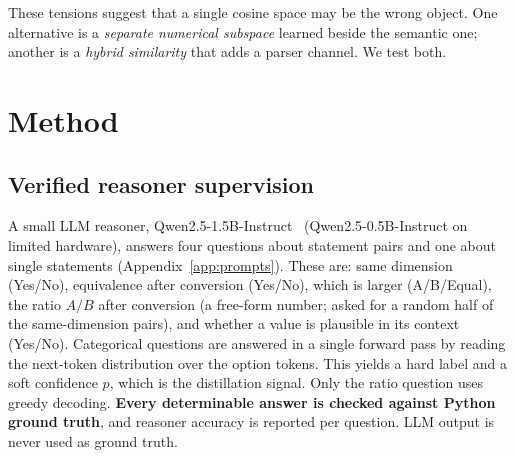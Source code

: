 \documentclass[11pt]{article}
\begin{document}
These tensions suggest that a single cosine space may be the wrong object. One alternative is a \emph{separate
numerical subspace} learned beside the semantic one; another is a \emph{hybrid similarity} that adds a parser channel.
We test both.

\section{Method}
\label{sec:method}
\subsection{Verified reasoner supervision}
A small LLM reasoner, Qwen2.5-1.5B-Instruct~\cite{qwen2025qwen25} (Qwen2.5-0.5B-Instruct on limited hardware), answers
four questions about statement pairs and one about single statements (Appendix~\ref{app:prompts}). These are: same
dimension (Yes/No), equivalence after conversion (Yes/No), which is larger (A/B/Equal), the ratio $A/B$ after
conversion (a free-form number; asked for a random half of the same-dimension pairs), and whether a value is plausible in its context (Yes/No). Categorical questions are
answered in a single forward pass by reading the next-token distribution over the option tokens. This yields a hard
label and a soft confidence $p$, which is the distillation signal. Only the ratio question uses greedy decoding.
\textbf{Every determinable answer is checked against Python ground truth}, and reasoner accuracy is reported per
question. LLM output is never used as ground truth.
\end{document}
